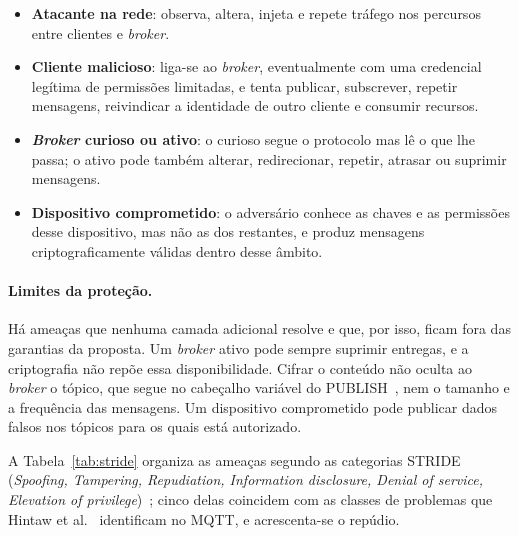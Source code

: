 \begin{itemize}[leftmargin=*]
  \item \textbf{Atacante na rede}: observa, altera, injeta e repete tráfego nos
    percursos entre clientes e \emph{broker}.
  \item \textbf{Cliente malicioso}: liga-se ao \emph{broker}, eventualmente com uma
    credencial legítima de permissões limitadas, e tenta publicar, subscrever,
    repetir mensagens, reivindicar a identidade de outro cliente e consumir
    recursos.
  \item \textbf{\emph{Broker} curioso ou ativo}: o curioso segue o protocolo mas lê
    o que lhe passa; o ativo pode também alterar, redirecionar, repetir, atrasar ou
    suprimir mensagens.
  \item \textbf{Dispositivo comprometido}: o adversário conhece as chaves e as
    permissões desse dispositivo, mas não as dos restantes, e produz mensagens
    criptograficamente válidas dentro desse âmbito.
\end{itemize}

\paragraph{Limites da proteção.} Há ameaças que nenhuma camada adicional resolve
e que, por isso, ficam fora das garantias da proposta. Um \emph{broker} ativo pode
sempre suprimir entregas, e a criptografia não repõe essa disponibilidade. Cifrar o
conteúdo não oculta ao \emph{broker} o tópico, que segue no cabeçalho variável do
PUBLISH~\cite[§3.3.2.1]{oasis-mqtt311}, nem o tamanho e a frequência das
mensagens. Um dispositivo comprometido pode publicar dados falsos nos tópicos para
os quais está autorizado.

A
Tabela~\ref{tab:stride} organiza as ameaças segundo as categorias
STRIDE (\emph{Spoofing, Tampering, Repudiation, Information disclosure,
Denial of service, Elevation of privilege})~\cite{kohnfelder1999threats}; cinco
delas coincidem com as classes de problemas que Hintaw et al.~\cite{hintaw2023mqtt}
identificam no MQTT, e acrescenta-se o repúdio.

